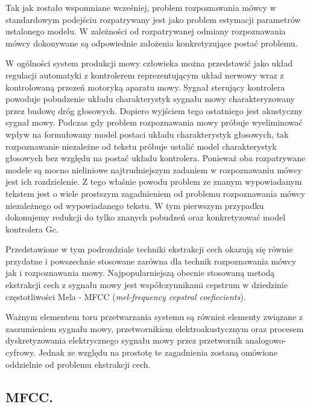 Tak jak zostało wspomniane wcześniej, problem rozpoznawania mówcy w standardowym podejściu rozpatrywany jest jako problem estymacji parametrów ustalonego modelu. W zależności od rozpatrywanej odmiany rozpoznawania mówcy dokonywane są odpowiednie założenia konkretyzujące postać problemu.

W ogólności system produkcji mowy człowieka można przedstawić jako układ regulacji automatyki z kontrolerem reprezentującym układ nerwowy wraz z kontrolowaną przezeń motoryką aparatu mowy. Sygnał sterujący kontrolera powoduje pobudzenie układu charakterystyk sygnału mowy charakteryzowany przez budowę dróg głosowych. Dopiero wyjściem tego ostatniego jest akustyczny sygnał mowy. Podczas gdy problem rozpoznawania mowy próbuje wyeliminować wpływ na formułowany model postaci układu charakterystyk głosowych, tak rozpoznawanie niezależne od tekstu próbuje ustalić model charakterystyk głosowych bez względu na postać układu kontrolera. Ponieważ oba rozpatrywane modele są mocno nieliniowe najtrudniejszym zadaniem w rozpoznawaniu mówcy jest ich rozdzielenie. Z tego właśnie powodu problem ze znanym wypowiadanym tekstem jest o wiele prostszym zagadnieniem od problemu rozpoznawania mówcy niezależnego od wypowiadanego tekstu. W tym pierwszym przypadku dokonujemy redukcji do tylko znanych pobudzeń oraz konkretyzować model kontrolera Gc.

Przedstawione w tym podrozdziale techniki ekstrakcji cech okazują się równie przydatne i powszechnie stosowane zarówna dla technik rozpoznawania mówcy jak i rozpoznawania mowy. Najpopularniejszą obecnie stosowaną metodą ekstrakcji cech z sygnału mowy jest współczynnikami cepstrum w dziedzinie częstotliwości Mela -  MFCC (\textit{mel-frequency cepstral coeficcients}). 

Ważnym elementem toru przetwarzania systemu są również elementy związane z zaszumieniem sygnału mowy, przetwornikiem elektroakustycznym oraz procesem dyskretyzowania elektrycznego sygnału mowy przez przetwornik analogowo-cyfrowy. Jednak ze względu na prostotę te zagadnienia zostaną omówione oddzielnie od problemu ekstrakcji cech.

\subsection{MFCC.}


